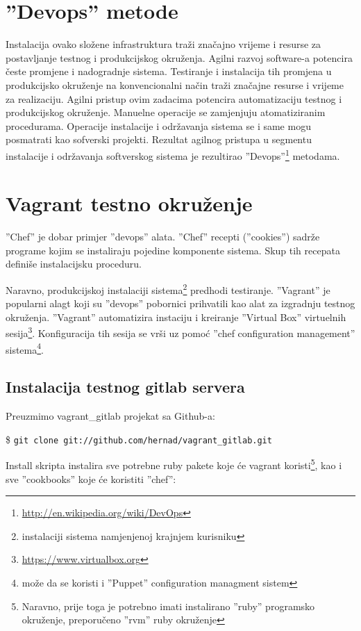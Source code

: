 \documentclass[times, utf8, seminar]{fit}
\begin{document}
\section{''Devops'' metode}
Instalacija ovako složene infrastruktura traži značajno vrijeme i resurse za postavljanje testnog i produkcijskog okruženja. 
Agilni razvoj software-a potencira česte promjene i nadogradnje sistema. Testiranje i instalacija tih promjena u produkcijsko okruženje na konvencionalni način traži značajne resurse i vrijeme za realizaciju. Agilni pristup ovim zadacima potencira automatizaciju testnog i produkcijskog okruženje. Manuelne operacije se zamjenjuju atomatiziranim procedurama. Operacije instalacije i održavanja sistema se i same mogu posmatrati kao sofverski projekti.
Rezultat agilnog pristupa u segmentu instalacije i održavanja softverskog sistema je rezultirao ''Devops''\footnote{\url{http://en.wikipedia.org/wiki/DevOps}} metodama.

\section{Vagrant testno okruženje}

''Chef'' je dobar primjer ''devops'' alata. ''Chef'' recepti (''cookies'') sadrže programe kojim se instaliraju pojedine komponente sistema. Skup tih recepata definiše instalacijsku proceduru.

Naravno, produkcijskoj instalaciji sistema\footnote{instalaciji sistema namjenjenoj krajnjem kurisniku} predhodi testiranje.
''Vagrant'' je popularni alagt koji su ''devops'' pobornici prihvatili kao alat za izgradnju testnog okruženja. 
''Vagrant'' automatizira instaciju i kreiranje ''Virtual Box'' virtuelnih sesija\footnote{\url{https://www.virtualbox.org}}. Konfiguracija tih sesija se vrši uz pomoć ''chef configuration management'' sistema\footnote{može da se koristi i ''Puppet'' configuration managment sistem}.

\subsection{Instalacija testnog gitlab servera}

Preuzmimo vagrant\_gitlab projekat sa Github-a:

\$ \verb+git clone git://github.com/hernad/vagrant_gitlab.git+

Install skripta instalira sve potrebne ruby pakete koje će vagrant koristi\footnote{Naravno, prije toga je potrebno imati instalirano ''ruby'' programsko okruženje, preporučeno ''rvm'' ruby okruženje}, kao i sve ''cookbooks'' koje će koristiti ''chef'':
\end{document}
